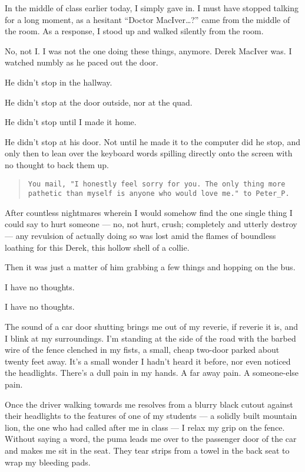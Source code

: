 In the middle of class earlier today, I simply gave in. I must have stopped talking for a long moment, as a hesitant ``Doctor MacIver\ldots{}?'' came from the middle of the room. As a response, I stood up and walked silently from the room.

No, not I. I was not the one doing these things, anymore. Derek MacIver was. I watched numbly as he paced out the door.

He didn't stop in the hallway.

He didn't stop at the door outside, nor at the quad.

He didn't stop until I made it home.

He didn't stop at his door. Not until he made it to the computer did he stop, and only then to lean over the keyboard words spilling directly onto the screen with no thought to back them up.

\begin{verse}
\texttt{You mail, "I honestly feel sorry for you. The only thing more pathetic than myself is anyone who would love me." to Peter\_P.}
\end{verse}

After countless nightmares wherein I would somehow find the one single thing I could say to hurt someone --- no, not hurt, crush; completely and utterly destroy --- any revulsion of actually doing so was lost amid the flames of boundless loathing for this Derek, this hollow shell of a collie.

Then it was just a matter of him grabbing a few things and hopping on the bus.

I have no thoughts.

I have no thoughts.

\secdiv{}

\noindent The sound of a car door shutting brings me out of my reverie, if reverie it is, and I blink at my surroundings. I'm standing at the side of the road with the barbed wire of the fence clenched in my fists, a small, cheap two-door parked about twenty feet away. It's a small wonder I hadn't heard it before, nor even noticed the headlights. There's a dull pain in my hands. A far away pain. A someone-else pain.

Once the driver walking towards me resolves from a blurry black cutout against their headlights to the features of one of my students --- a solidly built mountain lion, the one who had called after me in class --- I relax my grip on the fence. Without saying a word, the puma leads me over to the passenger door of the car and makes me sit in the seat. They tear strips from a towel in the back seat to wrap my bleeding pads.

